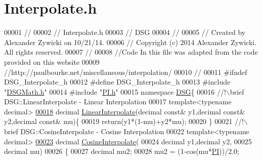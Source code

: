 \hypertarget{_interpolate_8h_source}{\section{Interpolate.\+h}
\label{_interpolate_8h_source}
}

\begin{DoxyCode}
00001 \textcolor{comment}{//}
00002 \textcolor{comment}{//  Interpolate.h}
00003 \textcolor{comment}{//  DSG}
00004 \textcolor{comment}{//}
00005 \textcolor{comment}{//  Created by Alexander Zywicki on 10/21/14.}
00006 \textcolor{comment}{//  Copyright (c) 2014 Alexander Zywicki. All rights reserved.}
00007 \textcolor{comment}{//}
00008 \textcolor{comment}{//Code In this file was adapted from the code provided on this website}
00009 \textcolor{comment}{//http://paulbourke.net/miscellaneous/interpolation/}
00010 \textcolor{comment}{//}
00011 \textcolor{preprocessor}{#ifndef DSG\_Interpolate\_h}
00012 \textcolor{preprocessor}{#define DSG\_Interpolate\_h}
00013 \textcolor{preprocessor}{#include "\hyperlink{_d_s_g_math_8h}{DSGMath.h}"}
00014 \textcolor{preprocessor}{#include "\hyperlink{_p_i_8h}{PI.h}"}
00015 \textcolor{keyword}{namespace }\hyperlink{namespace_d_s_g}{DSG}\{\textcolor{comment}{}
00016 \textcolor{comment}{    //!\(\backslash\)brief DSG::LinearInterpolate - Linear Interpolation}
00017 \textcolor{comment}{}    \textcolor{keyword}{template}<\textcolor{keyword}{typename} decimal>
\hypertarget{_interpolate_8h_source_l00018}{}\hyperlink{namespace_d_s_g_af4448472776648fb65623fd29eed262f}{00018}     decimal \hyperlink{namespace_d_s_g_af4448472776648fb65623fd29eed262f}{LinearInterpolate}(decimal \textcolor{keyword}{const}& y1,decimal \textcolor{keyword}{const}& y2,decimal \textcolor{keyword}{const}& mu)\{
00019         \textcolor{keywordflow}{return}(y1*(1-mu)+y2*mu);
00020     \}\textcolor{comment}{}
00021 \textcolor{comment}{    //!\(\backslash\)brief DSG::CosineInterpolate - Cosine Interpolation}
00022 \textcolor{comment}{}    \textcolor{keyword}{template}<\textcolor{keyword}{typename} decimal>
\hypertarget{_interpolate_8h_source_l00023}{}\hyperlink{namespace_d_s_g_a293229b6a440ddf9cc87e9a76d322d43}{00023}     decimal \hyperlink{namespace_d_s_g_a293229b6a440ddf9cc87e9a76d322d43}{CosineInterpolate}(
00024                               decimal y1,decimal y2,
00025                               decimal mu)
00026     \{
00027         decimal mu2;
00028         mu2 = (1-cos(mu*\hyperlink{_p_i_8h_a598a3330b3c21701223ee0ca14316eca}{PI}))/2.0;

\end{DoxyCode}
